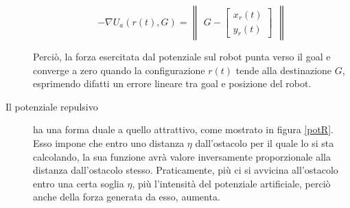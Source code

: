 \documentclass[14pt,a4paper]{extarticle}
\begin{document}
\begin{description}
\begin{equation}
-\nabla U_a(r(t),G) = \begin{Vmatrix}G - \begin{bmatrix} x_r(t)\\ y_r(t) \end{bmatrix}\end{Vmatrix}
\end{equation}

Perciò, la forza esercitata dal potenziale sul robot punta verso il goal e converge a zero quando la configurazione \(r(t)\) tende alla destinazione \(G\), esprimendo difatti un errore lineare tra goal e posizione del robot. 

\item[Il potenziale repulsivo] ha una forma duale a quello attrattivo, come mostrato in figura \ref{potR}. Esso impone che entro uno distanza \(\eta\) dall'ostacolo per il quale lo si sta calcolando, la sua funzione avrà valore inversamente proporzionale alla distanza dall'ostacolo stesso. Praticamente, più ci si avvicina all'ostacolo entro una certa soglia \(\eta\), più l'intensità del potenziale artificiale, perciò anche della forza generata da esso, aumenta.


\end{description}
\end{document}
